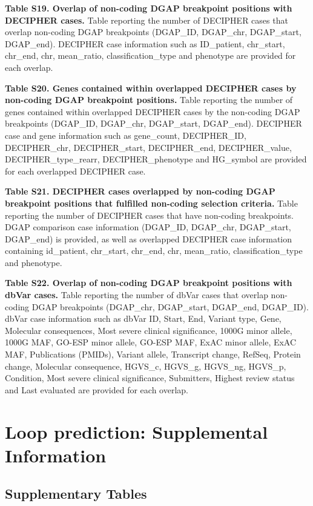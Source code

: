 \documentclass[a4paper,twoside=true,openright,parskip=full,chapterprefix=true,11pt,headings=normal,bibliography=totoc,listof=totoc,titlepage=on,captions=tableabove,draft=false]{scrreprt}
\theoremstyle{definition}
\theoremstyle{definition}
\theoremstyle{definition}
\theoremstyle{remark}
\begin{document}
\textbf{Table S19. Overlap of non-coding DGAP breakpoint positions with
DECIPHER cases.} Table reporting the number of DECIPHER cases that
overlap non-coding DGAP breakpoints (DGAP\_ID, DGAP\_chr, DGAP\_start,
DGAP\_end). DECIPHER case information such as ID\_patient, chr\_start,
chr\_end, chr, mean\_ratio, classification\_type and phenotype are
provided for each overlap.

\textbf{Table S20. Genes contained within overlapped DECIPHER cases by
non-coding DGAP breakpoint positions.} Table reporting the number of
genes contained within overlapped DECIPHER cases by the non-coding DGAP
breakpoints (DGAP\_ID, DGAP\_chr, DGAP\_start, DGAP\_end). DECIPHER case
and gene information such as gene\_count, DECIPHER\_ID, DECIPHER\_chr,
DECIPHER\_start, DECIPHER\_end, DECIPHER\_value, DECIPHER\_type\_rearr,
DECIPHER\_phenotype and HG\_symbol are provided for each overlapped
DECIPHER case.

\textbf{Table S21. DECIPHER cases overlapped by non-coding DGAP
breakpoint positions that fulfilled non-coding selection criteria.}
Table reporting the number of DECIPHER cases that have non-coding
breakpoints. DGAP comparison case information (DGAP\_ID, DGAP\_chr,
DGAP\_start, DGAP\_end) is provided, as well as overlapped DECIPHER case
information containing id\_patient, chr\_start, chr\_end, chr,
mean\_ratio, classification\_type and phenotype.

\textbf{Table S22. Overlap of non-coding DGAP breakpoint positions with
dbVar cases.} Table reporting the number of dbVar cases that overlap
non-coding DGAP breakpoints (DGAP\_chr, DGAP\_start, DGAP\_end,
DGAP\_ID). dbVar case information such as dbVar ID, Start, End, Variant
type, Gene, Molecular consequences, Most severe clinical significance,
1000G minor allele, 1000G MAF, GO-ESP minor allele, GO-ESP MAF, ExAC
minor allele, ExAC MAF, Publications (PMIDs), Variant allele, Transcript
change, RefSeq, Protein change, Molecular consequence, HGVS\_c, HGVS\_g,
HGVS\_ng, HGVS\_p, Condition, Most severe clinical significance,
Submitters, Highest review status and Last evaluated are provided for
each overlap.

\hypertarget{sup-loop}{%
\chapter{Loop prediction: Supplemental Information}\label{sup-loop}}

\hypertarget{LoopPredSupTab}{%
\section{Supplementary Tables}\label{LoopPredSupTab}}
\end{document}
